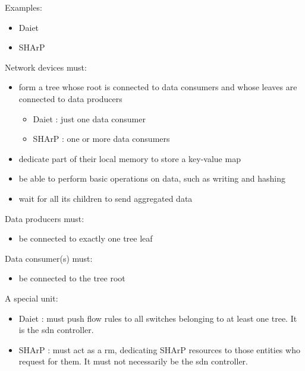 Examples:
\begin{itemize}
    \item Daiet \cite{daiet}
    \item SHArP \cite{sharp}
\end{itemize}
Network devices must:
\begin{itemize}
    \item form a tree whose root is connected to data consumers and whose leaves are connected to data producers
    \begin{itemize}
        \item Daiet \cite{daiet}: just one data consumer
        \item SHArP \cite{sharp}: one or more data consumers
    \end{itemize}
    \item dedicate part of their local memory to store a key-value map
    \item be able to perform basic operations on data, such as writing and hashing
    \item wait for all its children to send aggregated data
\end{itemize}
Data producers must:
\begin{itemize}
    \item be connected to exactly one tree leaf
\end{itemize}
Data consumer(s) must:
\begin{itemize}
    \item be connected to the tree root
\end{itemize}
A special unit:
\begin{itemize}
    \item Daiet \cite{daiet}: must push flow rules to all switches belonging to at least one tree. It is the \gls{sdn} controller.
    \item SHArP \cite{sharp}: must act as a \gls{rm}, dedicating SHArP \cite{sharp} resources to those entities who request for them. It must not necessarily be the \gls{sdn} controller.
\end{itemize}